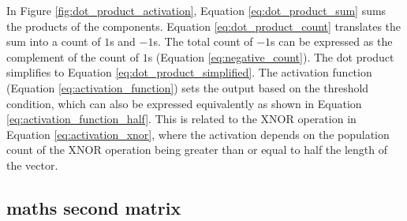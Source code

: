 \documentclass[conference,a4paper,flushend]{cs-techrep}
\begin{document}
In Figure \ref{fig:dot_product_activation}, Equation \ref{eq:dot_product_sum} sums the products of the components. Equation \ref{eq:dot_product_count} translates the sum into a count of \(1\)s and \(-1\)s. The total count of \(-1\)s can be expressed as the complement of the count of \(1\)s (Equation \ref{eq:negative_count}). The dot product simplifies to Equation \ref{eq:dot_product_simplified}. The activation function (Equation \ref{eq:activation_function}) sets the output based on the threshold condition, which can also be expressed equivalently as shown in Equation \ref{eq:activation_function_half}. This is related to the XNOR operation in Equation \ref{eq:activation_xnor}, where the activation depends on the population count of the XNOR operation being greater than or equal to half the length of the vector.


\subsection{maths second matrix}
\end{document}
